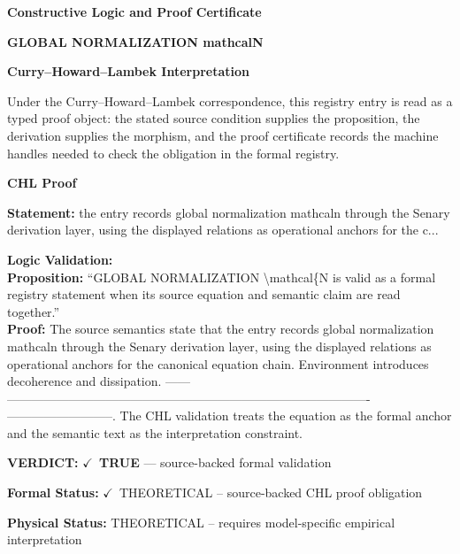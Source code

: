 \clearpage
\begingroup\tzpsupportsetup
\noindent\textbf{\fontsize{10.8pt}{12.8pt}\selectfont [ID 0563] Constructive Logic and Proof Certificate}\par
\noindent\textbf{\fontsize{10pt}{12pt}\selectfont GLOBAL NORMALIZATION mathcalN}\par
\vspace{0.45em}
\begingroup
\footnotesize
\setlength{\parskip}{0.22em}
\setlength{\parindent}{0pt}
\noindent\textbf{Curry--Howard--Lambek Interpretation}\par
Under the Curry--Howard--Lambek correspondence, this registry entry is read as a typed proof
object: the stated source condition supplies the proposition, the derivation supplies the
morphism, and the proof certificate records the machine handles needed to check the obligation
in the formal registry.

\vspace{0.45em}
\noindent\textbf{CHL Proof}\par
\textbf{Statement:} the entry records global normalization mathcaln through the Senary derivation layer,
using the displayed relations as operational anchors for the c...

\textbf{Logic Validation:}\\
\textbf{Proposition:} ``GLOBAL NORMALIZATION \textbackslash{}mathcal\{N is valid as a formal registry statement when its source
equation and semantic claim are read together.''\\
\textbf{Proof:} The source semantics state that the entry records global normalization mathcaln through
the Senary derivation layer, using the displayed relations as operational anchors for
the canonical equation chain. Environment introduces decoherence and dissipation. ------
----------------------------------------------------------------------------------------
--------------------------. The CHL validation treats the equation as the formal anchor
and the semantic text as the interpretation constraint.

\textbf{VERDICT:} \ensuremath{\checkmark}\ \textbf{TRUE} --- source-backed formal validation

\textbf{Formal Status:} \ensuremath{\checkmark}\ THEORETICAL -- source-backed CHL proof obligation

\textbf{Physical Status:} THEORETICAL -- requires model-specific empirical interpretation
\par\vspace{0.45em}
\par
\ifTZPDarkEdition
{}
\fi
\endgroup
\endgroup
